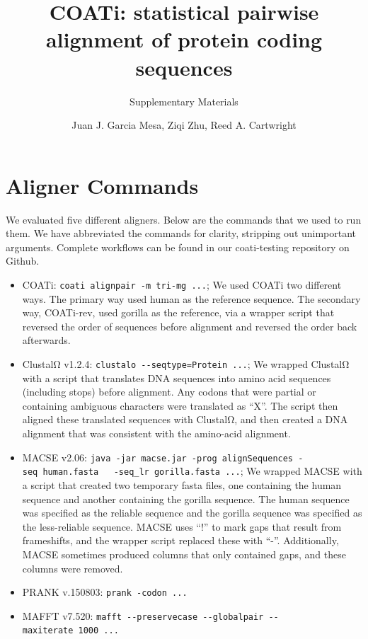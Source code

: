 \documentclass[
]{article}
\title{COATi: statistical pairwise alignment of protein coding sequences}
\subtitle{Supplementary Materials}
\author{Juan J. Garcia Mesa, Ziqi Zhu, Reed A. Cartwright}
\date{}
\providecommand{\tightlist}{%
  \setlength{\itemsep}{0pt}\setlength{\parskip}{0pt}}
\begin{document}
\maketitle

{
\setcounter{tocdepth}{2}
\tableofcontents
}
\section{Aligner Commands}\label{aligner-commands}

We evaluated five different aligners. Below are the commands that we used to run
them. We have abbreviated the commands for clarity, stripping out unimportant
arguments. Complete workflows can be found in our coati-testing repository on
Github.

\begin{itemize}
\tightlist
\item
  COATi: \texttt{coati\ alignpair\ -m\ tri-mg\ ...}; We used COATi two different ways. The
  primary way used human as the reference sequence. The secondary way,
  COATi-rev, used gorilla as the reference, via a wrapper script that reversed
  the order of sequences before alignment and reversed the order back
  afterwards.
\item
  ClustalΩ v1.2.4: \texttt{clustalo\ -\/-seqtype=Protein\ ...}; We wrapped ClustalΩ with a
  script that translates DNA sequences into amino acid sequences (including
  stops) before alignment. Any codons that were partial or containing ambiguous
  characters were translated as ``X''. The script then aligned these translated
  sequences with ClustalΩ, and then created a DNA alignment that was consistent
  with the amino-acid alignment.
\item
  MACSE v2.06: \texttt{java\ -jar\ macse.jar\ -prog\ alignSequences\ -seq\ human.fasta\ \ \ -seq\_lr\ gorilla.fasta\ ...}; We wrapped MACSE with a script that created two
  temporary fasta files, one containing the human sequence and another
  containing the gorilla sequence. The human sequence was specified as the
  reliable sequence and the gorilla sequence was specified as the less-reliable
  sequence. MACSE uses ``!'' to mark gaps that result from frameshifts, and the
  wrapper script replaced these with ``-''. Additionally, MACSE sometimes produced
  columns that only contained gaps, and these columns were removed.
\item
  PRANK v.150803: \texttt{prank\ -codon\ ...}
\item
  MAFFT v7.520: \texttt{mafft\ -\/-preservecase\ -\/-globalpair\ -\/-maxiterate\ 1000\ ...}
\end{itemize}
\end{document}
